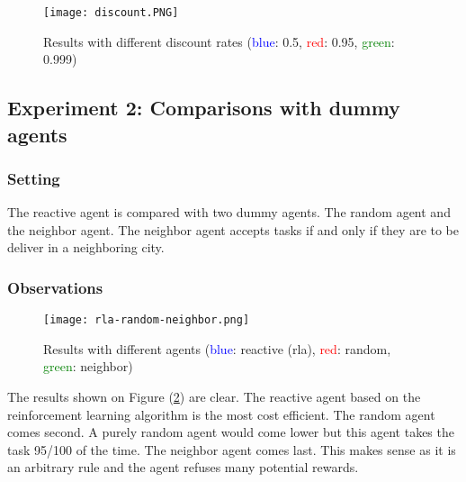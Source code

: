 \documentclass[11pt]{article}
\begin{document}
\begin{figure}[H]
	\centering
	\texttt{[image: discount.PNG]}
	\caption{Results with different discount rates (\textcolor{blue}{blue}: 0.5, \textcolor{red}{red}: 0.95, \textcolor{green}{green}: 0.999)}
    \label{fig:dr}
\end{figure}
    	
\subsection{Experiment 2: Comparisons with dummy agents}

\subsubsection{Setting}
The reactive agent is compared with two dummy agents. The random agent and the neighbor agent. The neighbor agent accepts tasks if and only if they are to be deliver in a neighboring city.

\subsubsection{Observations}

\begin{figure}[H]
	\centering
	\texttt{[image: rla-random-neighbor.png]}
\caption{Results with different agents (\textcolor{blue}{blue}: reactive (rla), \textcolor{red}{red}: random, \textcolor{green}{green}: neighbor)}
    \label{fig:exp2}
\end{figure}

The results shown on Figure (\ref{fig:exp2}) are clear. The reactive agent based on the reinforcement learning algorithm is the most cost efficient. The random agent comes second. A purely random agent would come lower but this agent takes the task 95/100 of the time. The neighbor agent comes last. This makes sense as it is an arbitrary rule and the agent refuses many potential rewards.
\end{document}
